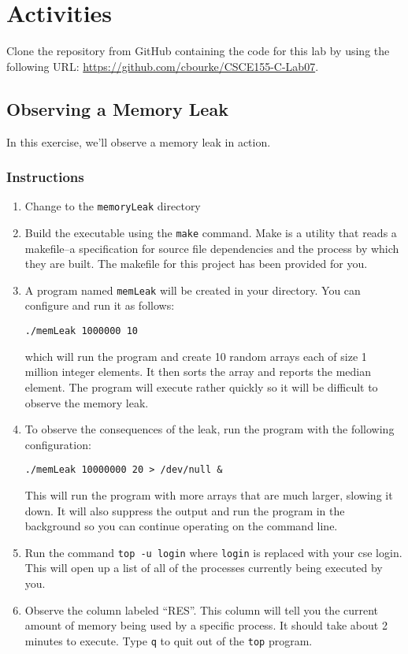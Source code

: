 \documentclass[12pt]{scrartcl}
\begin{document}
\section{Activities}

Clone the repository from GitHub containing the code for this lab by using 
the following URL: \url{https://github.com/cbourke/CSCE155-C-Lab07}.

\subsection{Observing a Memory Leak}

In this exercise, we'll observe a memory leak in action.

\subsubsection*{Instructions}
\begin{enumerate}
  \item Change to the \texttt{memoryLeak} directory
  \item Build the executable using the \texttt{make} command.  
  	Make is a utility that reads a makefile--a specification for source file 
	dependencies and the process by which they are built.  The makefile 
	for this project has been provided for you.
  \item A program named \texttt{memLeak} will be created in your 
	directory.  You can configure and run it as follows:
	
	\texttt{./memLeak 1000000 10}
	
	which will run the program and create 10 random arrays each of size
	1 million integer elements.  It then sorts the array and reports
	the median element.  The program will execute rather quickly so it
	will be difficult to observe the memory leak.

  \item To observe the consequences of the leak, run the program with
    the following configuration:	

	\texttt{./memLeak 10000000 20 > /dev/null &}
	
	This will run the program with more arrays that are much larger, 
	slowing it down.  It will also suppress the output and run the
	program in the background so you can continue operating on the
	command line.

  \item Run the command \texttt{top -u login} where \texttt{login}
	is replaced with your cse login.  This will open up a list of all of the 
	processes currently being executed by you.  
	
  \item Observe the column labeled ``RES''.  This column will tell you 
    the current amount of memory being used by a specific process.  
    It should take about 2 minutes to execute.  Type \texttt{q}
    to quit out of the \texttt{top} program.
\end{enumerate}
\end{document}
